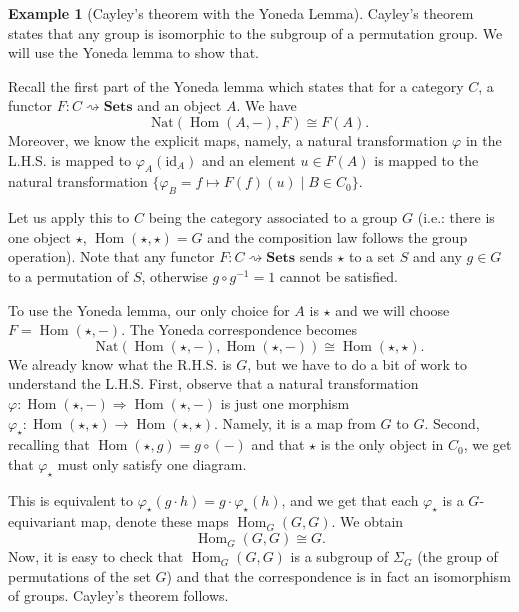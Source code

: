 \documentclass{article}
\theoremstyle{definition}
\newtheorem{exmp}[thm]{Example}
\theoremstyle{remark}
\DeclareMathOperator{\Hom}{Hom}
\newcommand{\id}{\text{id}}
\begin{document}
\begin{exmp}[Cayley's theorem with the Yoneda Lemma]
	Cayley's theorem states that any group is isomorphic to the subgroup of a permutation group. We will use the Yoneda lemma to show that.
	
	Recall the first part of the Yoneda lemma which states that for a category $C$, a functor $F:C \rightsquigarrow \textbf{Sets}$ and an object $A$. We have $$\text{Nat}(\Hom(A, -), F) \cong F(A).$$Moreover, we know the explicit maps, namely, a natural transformation $\varphi$ in the L.H.S. is mapped to $\varphi_A(\id_A)$ and an element $u \in F(A)$ is mapped to the natural transformation $\{\varphi_B = f \mapsto F(f)(u) \mid B \in C_0\}$.
	
	Let us apply this to $C$ being the category associated to a group $G$ (i.e.: there is one object $\star$, $\Hom(\star, \star) = G$ and the composition law follows the group operation). Note that any functor $F: C\rightsquigarrow \textbf{Sets}$ sends $\star$ to a set $S$ and any $g \in G$ to a permutation of $S$, otherwise $g\circ g^{-1} = 1$ cannot be satisfied.
	
	To use the Yoneda lemma, our only choice for $A$ is $\star$ and we will choose $F = \Hom(\star, -)$. The Yoneda correspondence becomes
	$$ \text{Nat}(\Hom(\star, -), \Hom(\star,-)) \cong \Hom(\star, \star).$$
	We already know what the R.H.S. is $G$, but we have to do a bit of work to understand the L.H.S. First, observe that a natural transformation $\varphi: \Hom(\star, -) \Rightarrow \Hom(\star, -)$ is just one morphism $\varphi_{\star}: \Hom(\star, \star) \rightarrow \Hom(\star, \star)$. Namely, it is a map from $G$ to $G$. Second, recalling that $\Hom(\star, g) = g \circ (-)$ and that $\star$ is the only object in $C_0$, we get that $\varphi_{\star}$ must only satisfy one diagram.
	\begin{figure}[H]
		\centering
	\end{figure}
	This is equivalent to $\varphi_{\star}(g \cdot h) = g \cdot \varphi_{\star}(h)$, and we get that each $\varphi_{\star}$ is a $G$-equivariant map, denote these maps $\Hom_G(G,G)$. We obtain
	$$\Hom_G(G,G) \cong G.$$
	Now, it is easy to check that $\Hom_G(G,G)$ is a subgroup of $\Sigma_G$ (the group of permutations of the set $G$) and that the correspondence is in fact an isomorphism of groups. Cayley's theorem follows.
	

\end{exmp}
\end{document}
